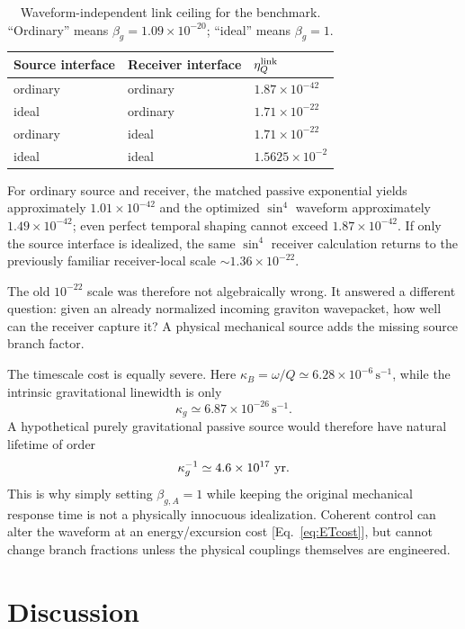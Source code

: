 \documentclass[11pt]{article}
\begin{document}
\begin{table}[t]
\centering
\caption{Waveform-independent link ceiling for the benchmark. ``Ordinary'' means $\beta_g=1.09\times10^{-20}$; ``ideal'' means $\beta_g=1$.}
\label{tab:link}
\begin{tabular}{lll}
\toprule
Source interface & Receiver interface & $\eta_Q^{\rm link}$ \\
\midrule
ordinary & ordinary & $1.87\times10^{-42}$ \\
ideal & ordinary & $1.71\times10^{-22}$ \\
ordinary & ideal & $1.71\times10^{-22}$ \\
ideal & ideal & $1.5625\times10^{-2}$ \\
\bottomrule
\end{tabular}
\end{table}

For ordinary source and receiver, the matched passive exponential yields approximately $1.01\times10^{-42}$ and the optimized $\sin^4$ waveform approximately $1.49\times10^{-42}$; even perfect temporal shaping cannot exceed $1.87\times10^{-42}$. If only the source interface is idealized, the same $\sin^4$ receiver calculation returns to the previously familiar receiver-local scale $\sim1.36\times10^{-22}$.

The old $10^{-22}$ scale was therefore not algebraically wrong. It answered a different question: given an already normalized incoming graviton wavepacket, how well can the receiver capture it? A physical mechanical source adds the missing source branch factor.

The timescale cost is equally severe. Here $\kappa_B=\omega/Q\simeq6.28\times10^{-6}\,\mathrm{s}^{-1}$, while the intrinsic gravitational linewidth is only
\begin{equation}
\kappa_g\simeq6.87\times10^{-26}\,\mathrm{s}^{-1}.
\end{equation}
A hypothetical purely gravitational passive source would therefore have natural lifetime of order
\begin{equation}
\kappa_g^{-1}\simeq4.6\times10^{17}\ {\rm yr}.
\end{equation}
This is why simply setting $\beta_{g,A}=1$ while keeping the original mechanical response time is not a physically innocuous idealization. Coherent control can alter the waveform at an energy/excursion cost [Eq.~\eqref{eq:ETcost}], but cannot change branch fractions unless the physical couplings themselves are engineered.

\section{Discussion}
\end{document}
